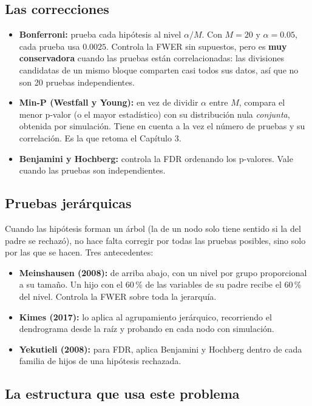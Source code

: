 \documentclass[11pt,a4paper]{article}
\begin{document}
\subsection{Las correcciones}

\begin{itemize}
  \item \textbf{Bonferroni:} prueba cada hipótesis al nivel $\alpha/M$. Con $M=20$
  y $\alpha=0.05$, cada prueba usa $0.0025$. Controla la FWER sin supuestos, pero
  es \textbf{muy conservadora} cuando las pruebas están correlacionadas: las
  divisiones candidatas de un mismo bloque comparten casi todos sus datos, así que
  no son 20 pruebas independientes.
  \item \textbf{Min-P (Westfall y Young):} en vez de dividir $\alpha$ entre $M$,
  compara el menor p-valor (o el mayor estadístico) con su distribución nula
  \emph{conjunta}, obtenida por simulación. Tiene en cuenta a la vez el número de
  pruebas y su correlación. Es la que retoma el Capítulo 3.
  \item \textbf{Benjamini y Hochberg:} controla la FDR ordenando los p-valores.
  Vale cuando las pruebas son independientes.
\end{itemize}

\subsection{Pruebas jerárquicas}

Cuando las hipótesis forman un árbol (la de un nodo solo tiene sentido si la del
padre se rechazó), no hace falta corregir por todas las pruebas posibles, sino solo
por las que se hacen. Tres antecedentes:
\begin{itemize}
  \item \textbf{Meinshausen (2008):} de arriba abajo, con un nivel por grupo
  proporcional a su tamaño. Un hijo con el 60\,\% de las variables de su padre
  recibe el 60\,\% del nivel. Controla la FWER sobre toda la jerarquía.
  \item \textbf{Kimes (2017):} lo aplica al agrupamiento jerárquico, recorriendo el
  dendrograma desde la raíz y probando en cada nodo con simulación.
  \item \textbf{Yekutieli (2008):} para FDR, aplica Benjamini y Hochberg dentro de
  cada familia de hijos de una hipótesis rechazada.
\end{itemize}

\subsection{La estructura que usa este problema}
\end{document}
